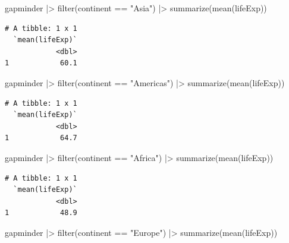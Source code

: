 \documentclass[
  letterpaper,
  DIV=11,
  numbers=noendperiod]{scrreprt}
\newenvironment{Shaded}{\begin{snugshade}}{\end{snugshade}}
\newcommand{\FunctionTok}[1]{\textcolor[rgb]{0.28,0.35,0.67}{#1}}
\newcommand{\NormalTok}[1]{\textcolor[rgb]{0.00,0.23,0.31}{#1}}
\newcommand{\SpecialCharTok}[1]{\textcolor[rgb]{0.37,0.37,0.37}{#1}}
\newcommand{\StringTok}[1]{\textcolor[rgb]{0.13,0.47,0.30}{#1}}
\begin{document}
\begin{Shaded}
\begin{Highlighting}[]
\NormalTok{gapminder }\SpecialCharTok{|\textgreater{}} \FunctionTok{filter}\NormalTok{(continent }\SpecialCharTok{==} \StringTok{"Asia"}\NormalTok{) }\SpecialCharTok{|\textgreater{}} \FunctionTok{summarize}\NormalTok{(}\FunctionTok{mean}\NormalTok{(lifeExp))}
\end{Highlighting}
\end{Shaded}

\begin{verbatim}
# A tibble: 1 x 1
  `mean(lifeExp)`
            <dbl>
1            60.1
\end{verbatim}

\begin{Shaded}
\begin{Highlighting}[]
\NormalTok{gapminder }\SpecialCharTok{|\textgreater{}} \FunctionTok{filter}\NormalTok{(continent }\SpecialCharTok{==} \StringTok{"Americas"}\NormalTok{) }\SpecialCharTok{|\textgreater{}} \FunctionTok{summarize}\NormalTok{(}\FunctionTok{mean}\NormalTok{(lifeExp))}
\end{Highlighting}
\end{Shaded}

\begin{verbatim}
# A tibble: 1 x 1
  `mean(lifeExp)`
            <dbl>
1            64.7
\end{verbatim}

\begin{Shaded}
\begin{Highlighting}[]
\NormalTok{gapminder }\SpecialCharTok{|\textgreater{}} \FunctionTok{filter}\NormalTok{(continent }\SpecialCharTok{==} \StringTok{"Africa"}\NormalTok{) }\SpecialCharTok{|\textgreater{}} \FunctionTok{summarize}\NormalTok{(}\FunctionTok{mean}\NormalTok{(lifeExp))}
\end{Highlighting}
\end{Shaded}

\begin{verbatim}
# A tibble: 1 x 1
  `mean(lifeExp)`
            <dbl>
1            48.9
\end{verbatim}

\begin{Shaded}
\begin{Highlighting}[]
\NormalTok{gapminder }\SpecialCharTok{|\textgreater{}} \FunctionTok{filter}\NormalTok{(continent }\SpecialCharTok{==} \StringTok{"Europe"}\NormalTok{) }\SpecialCharTok{|\textgreater{}} \FunctionTok{summarize}\NormalTok{(}\FunctionTok{mean}\NormalTok{(lifeExp))}
\end{Highlighting}
\end{Shaded}
\end{document}
